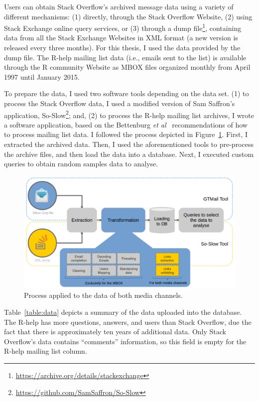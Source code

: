 \documentclass{sig-alternate-05-2015}
\begin{document}
	Users can obtain Stack Overflow's archived message data using a variety of different mechanisms:
	(1) directly, through the Stack Overflow Website,
	(2) using Stack Exchange online query services, or
	(3) through a dump file\footnote{\url{https://archive.org/details/stackexchange}}, containing data from all the Stack Exchange Websites in XML format (a new version is released every three months).
	For this thesis, I used the data provided by the dump file.
	The R-help mailing list data (i.e., emails sent to the list) is available through the R community Website as MBOX files organized monthly from April 1997 until January 2015.

	To prepare the data, I used two software tools depending on the data set.
	(1) to process the Stack Overflow data, I used a modified version of Sam Saffron's application, So-Slow\footnote{\url{https://github.com/SamSaffron/So-Slow}}; and,
	(2) to process the R-help mailing list archives, I wrote a software application, based on the Bettenburg \textit{et al}~\cite{Bettenburg2009} recommendations of how to process mailing list data.
	I followed the process depicted in Figure~\ref{fig:data_extraction}.
	First, I extracted the archived data.
	Then, I used the aforementioned tools to pre-process the archive files, and then load the data into a database. 
	Next, I executed custom queries to obtain random samples data to analyse.

	\begin{figure}[!htb]
		\centering
		\includegraphics[width=\columnwidth]{Figures/data_extraction}
		\caption[Data process]{Process applied to the data of both media channels.}
		\label{fig:data_extraction}
	\end{figure}

	Table~\ref{table:data} depicts a summary of the data uploaded into the database. 
	The R-help has more questions, answers, and users than Stack Overflow, due the fact that there is approximately ten years of additional data.
	Only Stack Overflow's data contains ``comments'' information, so this field is empty for the R-help mailing list column.
\end{document}
